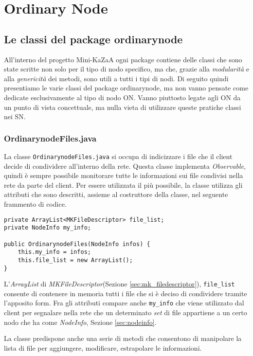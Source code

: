 \chapter{Ordinary Node}
\section{Le classi del package ordinarynode}
All'interno del progetto Mini-KaZaA ogni package contiene delle classi che sono state scritte non solo per il tipo di nodo specifico, ma che, grazie alla \emph{modularità} e alla \emph{genericità} dei metodi, sono utili a tutti i tipi di nodi.
Di seguito quindi presentiamo le varie classi del package ordinarynode, ma non vanno pensate come dedicate esclusivamente al tipo di nodo ON. Vanno piuttosto legate agli ON da un punto di vista concettuale, ma nulla vieta di utilizzare queste pratiche classi nei SN.

\subsection{OrdinarynodeFiles.java}\label{sec:on_files}
La classe \verb|OrdinarynodeFiles.java| si occupa di indicizzare i file che il client decide di condividere all'interno della rete.
Questa classe implementa \emph{Observable}, quindi è sempre possibile monitorare tutte le informazioni sui file condivisi nella rete da parte del client.
Per essere utilizzata il più possibile, la classe utilizza gli attributi che sono descritti, assieme al costruttore della classe, nel seguente frammento di codice.
\begin{lstlisting}
private ArrayList<MKFileDescriptor> file_list;
private NodeInfo my_info;

public OrdinarynodeFiles(NodeInfo infos) {
	this.my_info = infos;
	this.file_list = new ArrayList();
}
\end{lstlisting}

L'\emph{ArrayList} di \emph{MKFileDescriptor}(Sezione \ref{sec:mk_filedescriptor}), \verb|file_list| consente di contenere in memoria tutti i file che si è deciso di condividere tramite l'apposito form.
Fra gli attributi compare anche \verb|my_info| che viene utilizzato dal client per segnalare nella rete che un determinato \emph{set} di file appartiene a un certo nodo che ha come \emph{NodeInfo}, Sezione \ref{sec:nodeinfo}.

La classe predispone anche una serie di metodi che consentono di manipolare la lista di file per aggiungere, modificare, estrapolare le informazioni.

